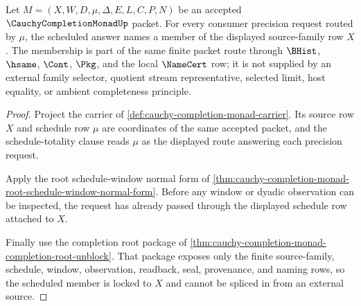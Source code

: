 \begin{theorem}
\label{thm:cauchy-completion-monad-schedule-source-membership}
Let $M=(X,W,D,\mu,\Delta,E,L,C,P,N)$ be an accepted $\CauchyCompletionMonadUp$ packet. For every consumer precision request routed by $\mu$, the scheduled answer names a member of the displayed source-family row $X$. The membership is part of the same finite packet route through $\BHist$, $\hsame$, $\Cont$, $\Pkg$, and the local $\NameCert$ row; it is not supplied by an external family selector, quotient stream representative, selected limit, host equality, or ambient completeness principle.
\end{theorem}
\begin{proof}
Project the carrier of \autoref{def:cauchy-completion-monad-carrier}. Its source row $X$ and schedule row $\mu$ are coordinates of the same accepted packet, and the schedule-totality clause reads $\mu$ as the displayed route answering each precision request.

Apply the root schedule-window normal form of \autoref{thm:cauchy-completion-monad-root-schedule-window-normal-form}. Before any window or dyadic observation can be inspected, the request has already passed through the displayed schedule row attached to $X$.

Finally use the completion root package of \autoref{thm:cauchy-completion-monad-completion-root-unblock}. That package exposes only the finite source-family, schedule, window, observation, readback, seal, provenance, and naming rows, so the scheduled member is locked to $X$ and cannot be spliced in from an external source.
\end{proof}

